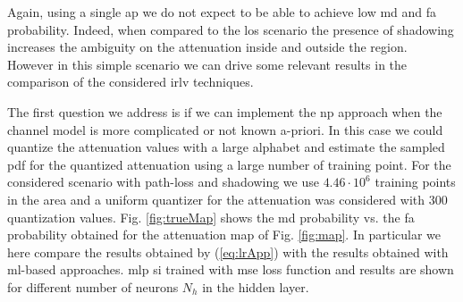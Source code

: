 \documentclass[draftcls,onecolumn,12pt]{IEEEtran}
\begin{document}
Again, using a single \ac{ap} we do not expect to be able to achieve low \ac{md} and \ac{fa} probability. Indeed, when compared to the \ac{los} scenario the presence of shadowing increases the ambiguity on the attenuation inside and outside the region. However in this simple scenario we can drive some relevant results in the comparison of the considered \ac{irlv} techniques. 



The first question we address is if we can implement the \ac{np} approach when the channel model is more complicated or not known a-priori. In this case we could quantize the attenuation values with a large alphabet and estimate the sampled \ac{pdf} for the quantized attenuation using a large number of training point. For the considered scenario with path-loss and shadowing we use $4.46 \cdot 10^6$ training points in the area and a uniform quantizer for the attenuation was considered with $300$ quantization values. Fig. \ref{fig:trueMap} shows the \ac{md} probability vs. the \ac{fa} probability obtained for the attenuation map of Fig. \ref{fig:map}. In particular we here compare the results obtained by (\ref{eq:lrApp}) with the results obtained with \ac{ml}-based approaches. \Ac{mlp} si trained with \ac{mse} loss function and results are shown for different number of neurons $N_h$ in the hidden layer.
\end{document}
